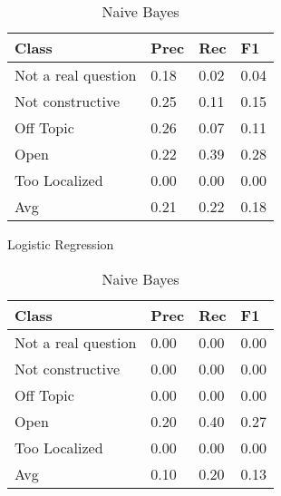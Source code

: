 
\begin{table}[!htpb]
\centering
\begin{minipage}{.5\linewidth}
    \begin{tabular}{|l|l|l|l|} \hline
    \textbf{Class}& \textbf{Prec} & \textbf{Rec} & \textbf{F1} \\ \hline
    Not a real question & 0.18      & 0.02   & 0.04     \\
    Not constructive    & 0.25      & 0.11   & 0.15     \\
    Off Topic           & 0.26      & 0.07   & 0.11     \\
    Open                & 0.22      & 0.39   & 0.28     \\
    Too Localized       & 0.00      & 0.00   & 0.00     \\ \hline
    Avg                 & 0.21      & 0.22   & 0.18   \\ \hline  
    \end{tabular}
    \caption{Logistic Regression}
    \label{tab2:lr}
\end{minipage}%
\begin{minipage}{.5\linewidth}
    \begin{tabular}{|l|l|l|l|} \hline
    \textbf{Class}& \textbf{Prec} & \textbf{Rec} & \textbf{F1} \\ \hline
    Not a real question & 0.00      & 0.00   & 0.00     \\
    Not constructive    & 0.00      & 0.00   & 0.00     \\
    Off Topic           & 0.00      & 0.00   & 0.00     \\
    Open                & 0.20      & 0.40   & 0.27     \\
    Too Localized       & 0.00      & 0.00   & 0.00     \\ \hline
    Avg                 & 0.10      & 0.20   & 0.13   \\ \hline  
    \end{tabular}
    \caption{Naive Bayes}
    \label{tab2:nb}
\end{minipage}
\end{table}


